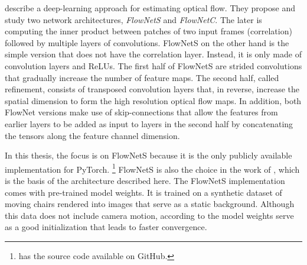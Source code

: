			\cite{dosovitskiy2015flownet} describe a deep-learning approach for estimating optical flow.
			They propose and study two network architectures, \emph{FlowNetS} and \emph{FlowNetC}.
			The later is computing the inner product between patches of two input frames (correlation) followed by multiple layers of convolutions.
			FlowNetS on the other hand is the simple version that does not have the correlation layer. 
			Instead, it is only made of convolution layers and ReLUs.
			The first half of FlowNetS are strided convolutions that gradually increase the number of feature maps. 
			The second half, called refinement, consists of transposed convolution layers that, in reverse, increase the spatial dimension to form the high resolution optical flow maps.
			In addition, both FlowNet versions make use of skip-connections that allow the features from earlier layers to be added as input to layers in the second half by concatenating the tensors along the feature channel dimension. 
			
			In this thesis, the focus is on FlowNetS because it is the only publicly available implementation for PyTorch.%
			\footnote{\citet*{flownetpytorch} has the source code available on GitHub.}
			FlowNetS is also the choice in the work of \citeauthor{wang2017deepvo}, which is the basis of the architecture described here.
			The FlowNetS implementation comes with pre-trained model weights.
			It is trained on a synthetic dataset of moving chairs rendered into images that serve as a static background.
			Although this data does not include camera motion, according to \citeauthor{wang2017deepvo} the model weights serve as a good initialization that leads to faster convergence. 
			

